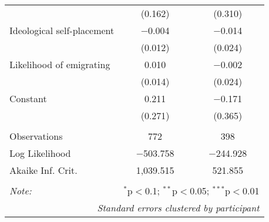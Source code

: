 \documentclass[12pt]{article}
\begin{document}
\begin{appendices}
\begin{table}[!htbp]
\begin{tabular}{@{\extracolsep{5pt}}lcc}
  & (0.162) & (0.310) \\ 
  Ideological self-placement & $-$0.004 & $-$0.014 \\ 
  & (0.012) & (0.024) \\ 
  Likelihood of emigrating & 0.010 & $-$0.002 \\ 
  & (0.014) & (0.024) \\ 
  Constant & 0.211 & $-$0.171 \\ 
  & (0.271) & (0.365) \\ 
 \hline \\[-1.8ex] 
Observations & 772 & 398 \\ 
Log Likelihood & $-$503.758 & $-$244.928 \\ 
Akaike Inf. Crit. & 1,039.515 & 521.855 \\ 
\hline 
\hline \\[-1.8ex] 
\textit{Note:}  & \multicolumn{2}{r}{$^{*}$p$<$0.1; $^{**}$p$<$0.05; $^{***}$p$<$0.01} \\ 
\multicolumn{3}{r}{\textit{Standard errors clustered by participant}}
\end{tabular} 
\end{table} 


\end{appendices}
\end{document}
